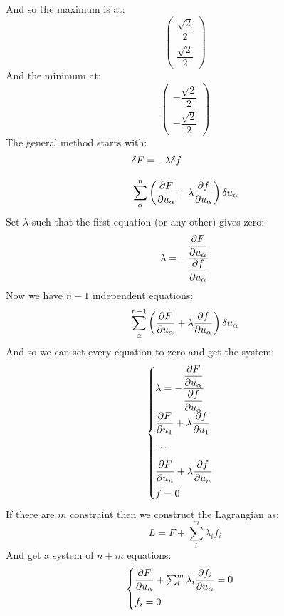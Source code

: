 And so the maximum is at:
\begin{equation}
  \begin{pmatrix}
    \dfrac{\sqrt{2}}{2} \\[8pt]
    \dfrac{\sqrt{2}}{2}
  \end{pmatrix}
\end{equation}
And the minimum at:
\begin{equation}
  \begin{pmatrix}
    -\dfrac{\sqrt{2}}{2} \\[8pt]
    -\dfrac{\sqrt{2}}{2}
  \end{pmatrix}
\end{equation}
The general method starts with:
\begin{equation}
  \begin{split}
    &\delta F = - \lambda \delta f \\[8pt]
    & \sum_{\alpha}^n \brackets{\pdv{F}{u_{\alpha}} + \lambda \pdv{f}{u_{\alpha}}} \delta u_{\alpha}
  \end{split}
\end{equation}
Set $\lambda$ such that the first equation (or any other) gives zero:
\begin{equation}
  \lambda = -\dfrac{\pdv{F}{u_{\alpha}}}{\pdv{f}{u_{\alpha}}}
\end{equation}
Now we have $n-1$ independent equations:
\begin{equation}
  \sum_{\alpha}^{n-1} \brackets{\pdv{F}{u_{\alpha}} + \lambda \pdv{f}{u_{\alpha}}} \delta u_{\alpha}
\end{equation}
And so we can set every equation to zero and get the system:
\begin{equation}
  \begin{cases}
    \lambda = -\dfrac{\pdv{F}{u_{\alpha}}}{\pdv{f}{u_{\alpha}}} \\[8pt]
    \pdv{F}{u_{1}} + \lambda \pdv{f}{u_{1}} \\[8pt]
    \dots \\[8pt]
    \pdv{F}{u_{n}} + \lambda \pdv{f}{u_{n}} \\[8pt]
    f = 0
  \end{cases}
\end{equation}
If there are $m$ constraint then we construct the Lagrangian as:
\begin{equation}
  L = F + \sum_i^m \lambda_i f_i
\end{equation}
And get a system of $n+m$ equations:
\begin{equation}
  \begin{cases}
    \pdv{F}{u_{\alpha}} + \sum_i^m \lambda_i \pdv{f_i}{u_{\alpha}} = 0 \\[8pt]
    f_i = 0
  \end{cases}
\end{equation}
